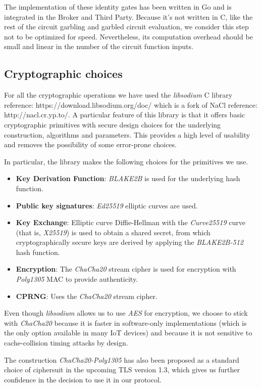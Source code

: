 The implementation of these identity gates has been written in Go and is
integrated in the Broker and Third Party.  Because it's not written in C, like
the rest of the circuit garbling and garbled circuit evaluation, we consider
this step not to be optimized for speed.  Nevertheless, its computation
overhead should be small and linear in the number of the circuit function
inputs.


\subsection{Cryptographic choices}

For all the cryptographic operations we have used the \emph{libsodium} C
library {reference: https://download.libsodium.org/doc/} which is a fork of
NaCl {reference: http://nacl.cr.yp.to/}.  A particular feature of this library
is that it offers basic cryptographic primitives with secure design choices
for the underlying construction, algorithms and parameters.  This provides a
high level of usability and removes the possibility of some error-prone
choices.

In particular, the library makes the following choices for the primitives we use.

\begin{itemize}
  \item \textbf{Key Derivation Function}: \emph{BLAKE2B} is used for the
    underlying hash function.
  \item \textbf{Public key signatures}: \emph{Ed25519} elliptic curves are used.
  \item \textbf{Key Exchange}: Elliptic curve Diffie-Hellman with the
    \emph{Curve25519} curve (that is, \emph{X25519}) is used to obtain a shared
    secret, from which cryptographically secure keys are derived by applying
    the \emph{BLAKE2B-512} hash function.
  \item \textbf{Encryption}: The \emph{ChaCha20} stream cipher is used for
    encryption with \emph{Poly1305} MAC to provide authenticity.
  \item \textbf{CPRNG}: Uses the \emph{ChaCha20} stream cipher.
\end{itemize}

Even though \emph{libsodium} allows us to use \emph{AES} for encryption, we
choose to stick with \emph{ChaCha20} because it is faster in software-only
implementations (which is the only option available in many IoT devices) and
because it is not sensitive to cache-collision timing attacks by design.

The construction \emph{ChaCha20-Poly1305} has also been proposed as a standard
choice of ciphersuit in the upcoming TLS version 1.3, which gives us further
confidence in the decision to use it in our protocol.
